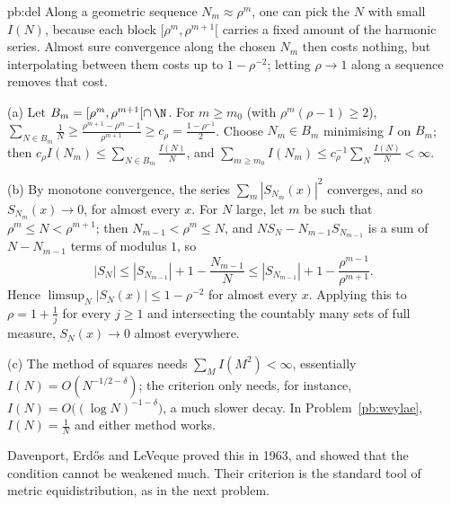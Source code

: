 \begin{solution}{pb:del}
\idea Along a geometric sequence $N_m\approx\rho^m$, one can pick the $N$ with small $I(N)$, because each block $[\rho^m,\rho^{m+1}[$ carries a fixed amount of the
harmonic series. Almost sure convergence along the chosen $N_m$ then costs nothing, but interpolating between them costs up to $1-\rho^{-2}$; letting $\rho\to1$
along a sequence removes that cost.

\writeup (a) Let $B_m=[\rho^m,\rho^{m+1}[\cap\,\N$. For $m\ge m_0$ (with $\rho^m(\rho-1)\ge2$), $\sum_{N\in B_m}\frac1N\ge\frac{\rho^{m+1}-\rho^m-1}{\rho^{m+1}}\ge c_\rho=\frac{1-\rho^{-1}}2$.
Choose $N_m\in B_m$ minimising $I$ on $B_m$; then $c_\rho I(N_m)\le\sum_{N\in B_m}\frac{I(N)}N$, and $\sum_{m\ge m_0}I(N_m)\le c_\rho^{-1}\sum_N\frac{I(N)}N<\infty$.

(b) By monotone convergence, the series $\sum_m|S_{N_m}(x)|^2$ converges, and so $S_{N_m}(x)\to0$, for almost every $x$. For $N$ large, let $m$ be such that $\rho^m\le N<\rho^{m+1}$; then $N_{m-1}<\rho^m\le N$, and
$NS_N-N_{m-1}S_{N_{m-1}}$ is a sum of $N-N_{m-1}$ terms of modulus $1$, so
\[
|S_N|\le|S_{N_{m-1}}|+1-\frac{N_{m-1}}N\le|S_{N_{m-1}}|+1-\frac{\rho^{m-1}}{\rho^{m+1}}.
\]
Hence $\limsup_N|S_N(x)|\le1-\rho^{-2}$ for almost every $x$. Applying this to $\rho=1+\frac1j$ for every $j\ge1$ and intersecting the countably many sets of full measure,
$S_N(x)\to0$ almost everywhere.

(c) The method of squares needs $\sum_MI(M^2)<\infty$, essentially $I(N)=O(N^{-1/2-\delta})$; the criterion only needs, for instance, $I(N)=O\bigl((\log N)^{-1-\delta}\bigr)$, a much slower
decay. In Problem~\ref{pb:weylae}, $I(N)=\frac1N$ and either method works.

\leads Davenport, Erdős and LeVeque proved this in 1963, and showed that the condition cannot be weakened much. Their criterion is the standard tool of metric
equidistribution, as in the next problem.
\end{solution}

